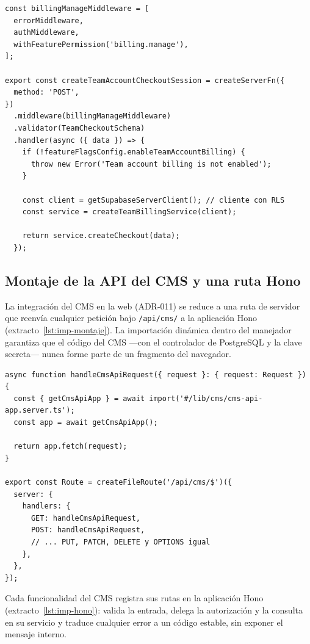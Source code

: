 \begin{lstlisting}[style=pymekit, caption={Server function de pago de equipo (\texttt{billing.functions.ts}, recortado).}, label={lst:imp-sfn}]
const billingManageMiddleware = [
  errorMiddleware,
  authMiddleware,
  withFeaturePermission('billing.manage'),
];

export const createTeamAccountCheckoutSession = createServerFn({
  method: 'POST',
})
  .middleware(billingManageMiddleware)
  .validator(TeamCheckoutSchema)
  .handler(async ({ data }) => {
    if (!featureFlagsConfig.enableTeamAccountBilling) {
      throw new Error('Team account billing is not enabled');
    }

    const client = getSupabaseServerClient(); // cliente con RLS
    const service = createTeamBillingService(client);

    return service.createCheckout(data);
  });
\end{lstlisting}

\subsection{Montaje de la API del CMS y una ruta Hono}

La integración del CMS en la web (ADR-011) se reduce a una ruta de servidor
que reenvía cualquier petición bajo \texttt{/api/cms/} a la aplicación Hono
(extracto~\ref{lst:imp-montaje}). La importación dinámica dentro del
manejador garantiza que el código del CMS ---con el controlador de PostgreSQL
y la clave secreta--- nunca forme parte de un fragmento del navegador.

\begin{lstlisting}[style=pymekit, caption={Montaje de la API del CMS (\texttt{routes/api/cms/\$.ts}).}, label={lst:imp-montaje}]
async function handleCmsApiRequest({ request }: { request: Request }) {
  const { getCmsApiApp } = await import('#/lib/cms/cms-api-app.server.ts');
  const app = await getCmsApiApp();

  return app.fetch(request);
}

export const Route = createFileRoute('/api/cms/$')({
  server: {
    handlers: {
      GET: handleCmsApiRequest,
      POST: handleCmsApiRequest,
      // ... PUT, PATCH, DELETE y OPTIONS igual
    },
  },
});
\end{lstlisting}

Cada funcionalidad del CMS registra sus rutas en la aplicación Hono
(extracto~\ref{lst:imp-hono}): valida la entrada, delega la autorización y la
consulta en su servicio y traduce cualquier error a un código estable, sin
exponer el mensaje interno.

